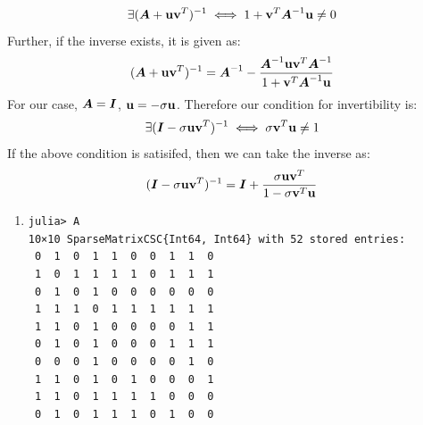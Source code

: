 \documentclass[]{exam}
\begin{document}
\begin{questions}
\begin{enumerate}[label=\arabic*.]
		$$
			\exists (\boldsymbol{A} + \boldsymbol{\mathrm{u}} \boldsymbol{\mathrm{v}}^T)^{-1} \iff 1 + \boldsymbol{\mathrm{v}}^T \boldsymbol{A}^{-1} \boldsymbol{\mathrm{u}} \neq 0
		$$
		Further, if the inverse exists, it is given as:
		$$
			(\boldsymbol{A} + \boldsymbol{\mathrm{u}} \boldsymbol{\mathrm{v}}^T)^{-1} = \boldsymbol{A}^{-1} - \frac{\boldsymbol{A}^{-1} \boldsymbol{\mathrm{u}} \boldsymbol{\mathrm{v}}^T \boldsymbol{A}^{-1}}{1 + \boldsymbol{\mathrm{v}}^T \boldsymbol{A}^{-1} \boldsymbol{\mathrm{u}}}
		$$
		For our case, $\boldsymbol{A}  = \boldsymbol{I}$, $\boldsymbol{\mathrm{u}} = -\sigma \boldsymbol{\mathrm{u}}$. Therefore our condition for invertibility is:
		$$
			\exists (\boldsymbol{I} - \sigma \boldsymbol{\mathrm{u}} \boldsymbol{\mathrm{v}}^T)^{-1} \iff \sigma \boldsymbol{\mathrm{v}}^T \boldsymbol{\mathrm{u}} \neq 1
		$$
		If the above condition is satisifed, then we can take the inverse as:
		$$
			(\boldsymbol{I} - \sigma \boldsymbol{\mathrm{u}} \boldsymbol{\mathrm{v}}^T)^{-1} = \boldsymbol{I} + \frac{\sigma \boldsymbol{\mathrm{u}} \boldsymbol{\mathrm{v}}^T}{1 - \sigma \boldsymbol{\mathrm{v}}^T \boldsymbol{\mathrm{u}}}
		$$
\end{enumerate}

\newpage
\question
\hfill

\begin{enumerate}[label=\arabic*.]
	\item 
		\begin{Verbatim}[breaklines]
julia> A
10×10 SparseMatrixCSC{Int64, Int64} with 52 stored entries:
 0  1  0  1  1  0  0  1  1  0
 1  0  1  1  1  1  0  1  1  1
 0  1  0  1  0  0  0  0  0  0
 1  1  1  0  1  1  1  1  1  1
 1  1  0  1  0  0  0  0  1  1
 0  1  0  1  0  0  0  1  1  1
 0  0  0  1  0  0  0  0  1  0
 1  1  0  1  0  1  0  0  0  1
 1  1  0  1  1  1  1  0  0  0
 0  1  0  1  1  1  0  1  0  0


\end{Verbatim}
\end{enumerate}
\end{questions}
\end{document}
